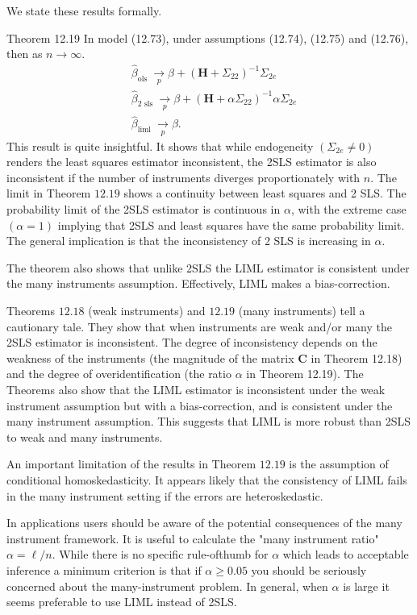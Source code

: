 \documentclass[10pt]{article}
\begin{document}
We state these results formally.

Theorem 12.19 In model (12.73), under assumptions (12.74), (12.75) and (12.76), then as $n \rightarrow \infty$.
$$
\begin{aligned}
&\widehat{\beta}_{\text {ols }} \underset{p}{\longrightarrow} \beta+\left(\boldsymbol{H}+\Sigma_{22}\right)^{-1} \Sigma_{2 e} \\
&\widehat{\beta}_{2 \text { sls }} \underset{p}{\longrightarrow} \beta+\left(\boldsymbol{H}+\alpha \Sigma_{22}\right)^{-1} \alpha \Sigma_{2 e} \\
&\widehat{\beta}_{\text {liml }} \underset{p}{\longrightarrow} \beta .
\end{aligned}
$$
This result is quite insightful. It shows that while endogeneity $\left(\Sigma_{2 e} \neq 0\right)$ renders the least squares estimator inconsistent, the 2SLS estimator is also inconsistent if the number of instruments diverges proportionately with $n$. The limit in Theorem $12.19$ shows a continuity between least squares and 2 SLS. The probability limit of the 2SLS estimator is continuous in $\alpha$, with the extreme case $(\alpha=1)$ implying that 2SLS and least squares have the same probability limit. The general implication is that the inconsistency of 2 SLS is increasing in $\alpha$.

The theorem also shows that unlike 2SLS the LIML estimator is consistent under the many instruments assumption. Effectively, LIML makes a bias-correction.

Theorems $12.18$ (weak instruments) and $12.19$ (many instruments) tell a cautionary tale. They show that when instruments are weak and/or many the 2SLS estimator is inconsistent. The degree of inconsistency depends on the weakness of the instruments (the magnitude of the matrix $\boldsymbol{C}$ in Theorem 12.18) and the degree of overidentification (the ratio $\alpha$ in Theorem 12.19). The Theorems also show that the LIML estimator is inconsistent under the weak instrument assumption but with a bias-correction, and is consistent under the many instrument assumption. This suggests that LIML is more robust than 2SLS to weak and many instruments.

An important limitation of the results in Theorem $12.19$ is the assumption of conditional homoskedasticity. It appears likely that the consistency of LIML fails in the many instrument setting if the errors are heteroskedastic.

In applications users should be aware of the potential consequences of the many instrument framework. It is useful to calculate the "many instrument ratio" $\alpha=\ell / n$. While there is no specific rule-ofthumb for $\alpha$ which leads to acceptable inference a minimum criterion is that if $\alpha \geq 0.05$ you should be seriously concerned about the many-instrument problem. In general, when $\alpha$ is large it seems preferable to use LIML instead of 2SLS.
\end{document}
